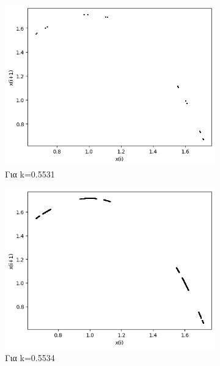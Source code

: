 \begin{figure}[h!]
\begin{subfigure}[b]{0.25\textwidth}
		\includegraphics[width=\textwidth]{LateX images/graphs q05/g7}
		\caption{Για k=0.5531}
		\label{f:k31}
	\end{subfigure}
	\hfill
	\begin{subfigure}[b]{0.25\textwidth}
		\centering
		\includegraphics[width=\textwidth]{LateX images/graphs q05/g8}
		\caption{Για k=0.5534}
		\label{f:k32}
	\end{subfigure}
	\hfill
	\begin{subfigure}[b]{0.25\textwidth}
		\centering

\end{subfigure}
\end{figure}
